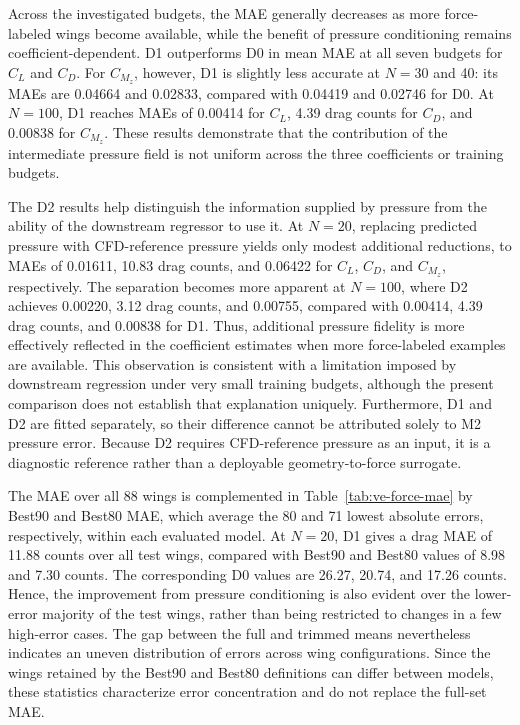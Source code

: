 Across the investigated budgets, the MAE generally decreases as more force-labeled wings become available, while the benefit of pressure conditioning remains coefficient-dependent. D1 outperforms D0 in mean MAE at all seven budgets for $C_L$ and $C_D$. For $C_{M_z}$, however, D1 is slightly less accurate at $N=30$ and 40: its MAEs are 0.04664 and 0.02833, compared with 0.04419 and 0.02746 for D0. At $N=100$, D1 reaches MAEs of 0.00414 for $C_L$, 4.39 drag counts for $C_D$, and 0.00838 for $C_{M_z}$. These results demonstrate that the contribution of the intermediate pressure field is not uniform across the three coefficients or training budgets.

The D2 results help distinguish the information supplied by pressure from the ability of the downstream regressor to use it. At $N=20$, replacing predicted pressure with CFD-reference pressure yields only modest additional reductions, to MAEs of 0.01611, 10.83 drag counts, and 0.06422 for $C_L$, $C_D$, and $C_{M_z}$, respectively. The separation becomes more apparent at $N=100$, where D2 achieves 0.00220, 3.12 drag counts, and 0.00755, compared with 0.00414, 4.39 drag counts, and 0.00838 for D1. Thus, additional pressure fidelity is more effectively reflected in the coefficient estimates when more force-labeled examples are available. This observation is consistent with a limitation imposed by downstream regression under very small training budgets, although the present comparison does not establish that explanation uniquely. Furthermore, D1 and D2 are fitted separately, so their difference cannot be attributed solely to M2 pressure error. Because D2 requires CFD-reference pressure as an input, it is a diagnostic reference rather than a deployable geometry-to-force surrogate.

The MAE over all 88 wings is complemented in Table~\ref{tab:ve-force-mae} by Best90 and Best80 MAE, which average the 80 and 71 lowest absolute errors, respectively, within each evaluated model. At $N=20$, D1 gives a drag MAE of 11.88 counts over all test wings, compared with Best90 and Best80 values of 8.98 and 7.30 counts. The corresponding D0 values are 26.27, 20.74, and 17.26 counts. Hence, the improvement from pressure conditioning is also evident over the lower-error majority of the test wings, rather than being restricted to changes in a few high-error cases. The gap between the full and trimmed means nevertheless indicates an uneven distribution of errors across wing configurations. Since the wings retained by the Best90 and Best80 definitions can differ between models, these statistics characterize error concentration and do not replace the full-set MAE.

